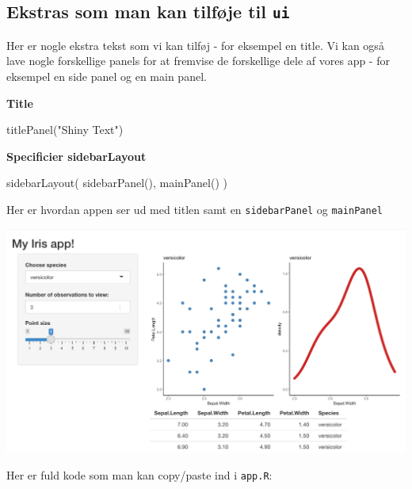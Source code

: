 \documentclass[
]{book}
\newenvironment{Shaded}{\begin{snugshade}}{\end{snugshade}}
\newcommand{\FunctionTok}[1]{\textcolor[rgb]{0.00,0.00,0.00}{#1}}
\newcommand{\NormalTok}[1]{#1}
\newcommand{\StringTok}[1]{\textcolor[rgb]{0.31,0.60,0.02}{#1}}
\begin{document}
\hypertarget{ekstras-som-man-kan-tilfuxf8je-til-ui}{%
\subsection{\texorpdfstring{Ekstras som man kan tilføje til \texttt{ui}}{Ekstras som man kan tilføje til ui}}\label{ekstras-som-man-kan-tilfuxf8je-til-ui}}

Her er nogle ekstra tekst som vi kan tilføj - for eksempel en title. Vi kan også lave nogle forskellige panels for at fremvise de forskellige dele af vores app - for eksempel en side panel og en main panel.

\textbf{Title}

\begin{Shaded}
\begin{Highlighting}[]
  \FunctionTok{titlePanel}\NormalTok{(}\StringTok{"Shiny Text"}\NormalTok{)}
\end{Highlighting}
\end{Shaded}

\textbf{Specificier sidebarLayout}

\begin{Shaded}
\begin{Highlighting}[]
  \FunctionTok{sidebarLayout}\NormalTok{(}
    \FunctionTok{sidebarPanel}\NormalTok{(),}
    \FunctionTok{mainPanel}\NormalTok{()}
\NormalTok{  )}
\end{Highlighting}
\end{Shaded}

Her er hvordan appen ser ud med titlen samt en \texttt{sidebarPanel} og \texttt{mainPanel}

\includegraphics[width=0.75\linewidth]{plots/shiny_panel3}

Her er fuld kode som man kan copy/paste ind i \texttt{app.R}:
\end{document}
